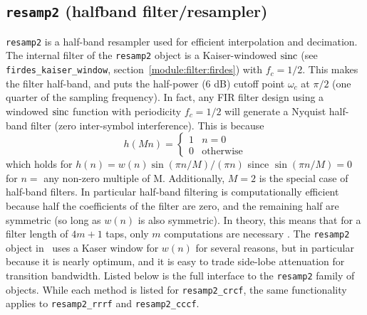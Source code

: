 \subsection{{\tt resamp2} (halfband filter/resampler)}
\label{module:filter:resamp2}
{\tt resamp2} is a half-band resampler used for efficient interpolation
and decimation.
The internal filter of the {\tt resamp2} object is a Kaiser-windowed $\textup{sinc}$
(see {\tt firdes\_kaiser\_window}, section~\ref{module:filter:firdes}) with
$f_c = 1/2$.
This makes the filter half-band, and puts the half-power (6 dB) cutoff point
$\omega_c$ at $\pi/2$ (one quarter of the sampling frequency).
In fact, any FIR filter design using a windowed $\textup{sinc}$ function with
periodicity $f_c=1/2$ will generate a Nyquist half-band filter (zero
inter-symbol interference).
This is because \cite[(4.6.3)]{Vaidyanathan:1993}
%
\begin{equation}
\label{eqn:filter:resamp:h}
    h(Mn) = 
        \begin{cases}
        1 & n=0 \\
        0 & \text{otherwise}
        \end{cases}
\end{equation}
%
which holds for $h(n) = w(n) \sin(\pi n/M) / (\pi n)$ since
$\sin(\pi n/M) = 0$ for $n=$ any non-zero multiple of M.
Additionally, $M=2$ is the special case of half-band filters.
In particular half-band filtering is computationally efficient because half
the coefficients of the filter are zero, and the remaining half are symmetric
(so long as $w(n)$ is also symmetric).
In theory, this means that for a filter length of $4m+1$ taps, only $m$
computations are necessary \cite{harris:2004}.
The {\tt resamp2} object in \liquid\ uses a Kaser window for $w(n)$ for
several reasons, but in particular because it is nearly optimum, and it is
easy to trade side-lobe attenuation for transition bandwidth.
%
Listed below is the full interface to the {\tt resamp2} family of
objects.
While each method is listed for {\tt resamp2\_crcf}, the same
functionality applies to {\tt resamp2\_rrrf} and {\tt resamp2\_cccf}.
%
